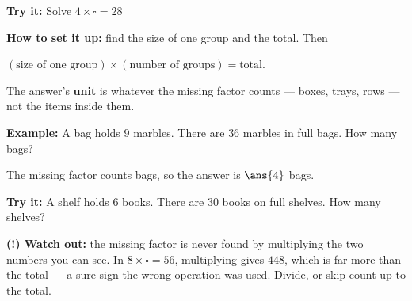 \documentclass[12pt]{article}
\begin{document}
\begin{tryitbox}
\textbf{Try it:} \quad Solve $4 \times \square = 28$\\[2pt]
\end{tryitbox}


\begin{formulabox}
\textbf{How to set it up:} find the size of one group and the total. Then\par
$(\text{size of one group}) \times (\text{number of groups}) = \text{total}$.\par
The answer's \textbf{unit} is whatever the missing factor counts --- boxes, trays, rows --- not the
items inside them.
\end{formulabox}

\begin{examplebox}
\textbf{Example:} \quad A bag holds $9$ marbles. There are $36$ marbles in full bags. How many bags?

The missing factor counts bags, so the answer is $\ans{4}$ bags.
\end{examplebox}

\begin{tryitbox}
\textbf{Try it:} \quad A shelf holds $6$ books. There are $30$ books on full shelves. How many shelves?\\[2pt]
\end{tryitbox}

\begin{watchoutbox}
\textbf{(!) Watch out:} the missing factor is never found by multiplying the two numbers you can see.
In $8 \times \square = 56$, multiplying gives $448$, which is far more than the total --- a sure sign
the wrong operation was used. Divide, or skip-count up to the total.
\end{watchoutbox}
\end{document}
